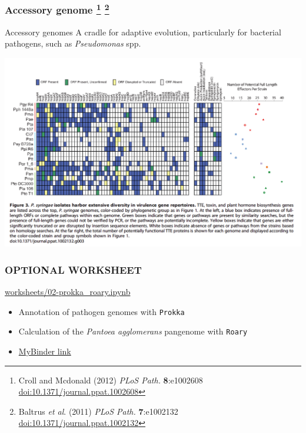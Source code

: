 \begin{frame}
  \frametitle{Accessory genome
   \footnote{\tiny{Croll and Mcdonald (2012) \textit{PLoS Path.} \textbf{8}:e1002608 \href{http://dx.doi.org/10.1371/journal.ppat.1002608}{doi:10.1371/journal.ppat.1002608}}}
    \footnote{\tiny{Baltrus \textit{et al}. (2011) \textit{PLoS Path.} \textbf{7}:e1002132 \href{http://dx.doi.org/10.1371/journal.ppat.1002132}{doi:10.1371/journal.ppat.1002132}}}  
  }
  \begin{block}{Accessory genomes}
    A cradle for adaptive evolution, particularly for bacterial pathogens, such as \textit{Pseudomonas} spp.
  \end{block}
  \begin{center}
      \includegraphics[height=0.45\textheight]{images/pa_virulence} 
  \end{center}
\end{frame}

\begin{frame}
  \frametitle{OPTIONAL WORKSHEET}
  \begin{alertblock}{\url{worksheets/02-prokka_roary.ipynb}}
    \begin{itemize}
      \item Annotation of pathogen genomes with \texttt{Prokka}
      \item Calculation of the \textit{Pantoea agglomerans} pangenome with \texttt{Roary}
    \end{itemize}
  \end{alertblock}
  \begin{itemize}
    \item \textcolor{hutton_purple}{\href{http://mybinder.org/repo/widdowquinn/Teaching-EMBL-Plant-Path-Genomics}{MyBinder link}}
  \end{itemize}
\end{frame}